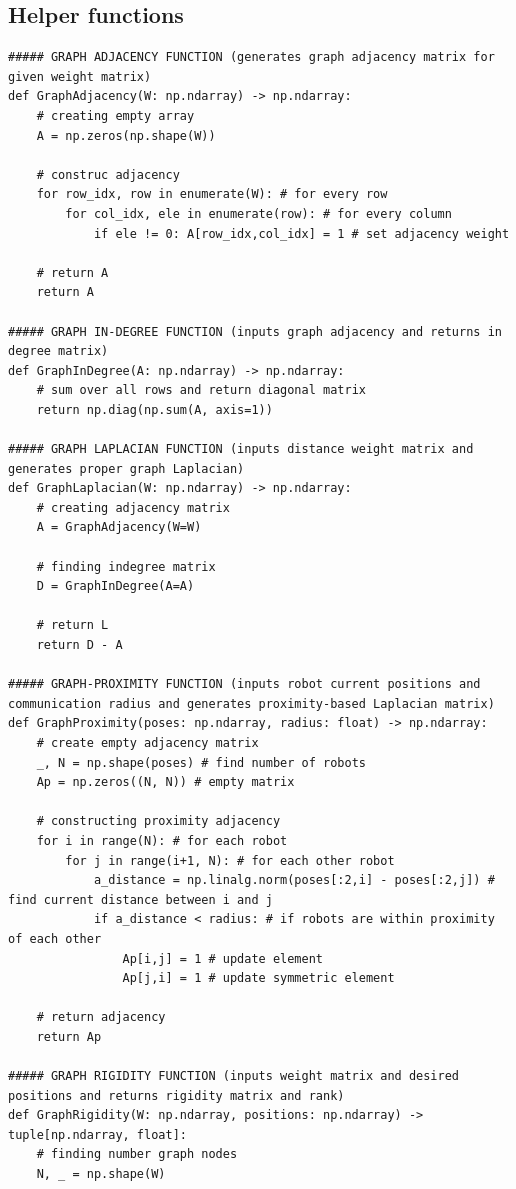 \documentclass[11pt]{article}
\begin{document}
\subsection{Helper functions}
\begin{verbatim}
##### GRAPH ADJACENCY FUNCTION (generates graph adjacency matrix for given weight matrix)
def GraphAdjacency(W: np.ndarray) -> np.ndarray:
    # creating empty array
    A = np.zeros(np.shape(W))

    # construc adjacency
    for row_idx, row in enumerate(W): # for every row
        for col_idx, ele in enumerate(row): # for every column
            if ele != 0: A[row_idx,col_idx] = 1 # set adjacency weight

    # return A
    return A

##### GRAPH IN-DEGREE FUNCTION (inputs graph adjacency and returns in degree matrix)
def GraphInDegree(A: np.ndarray) -> np.ndarray:
    # sum over all rows and return diagonal matrix
    return np.diag(np.sum(A, axis=1))

##### GRAPH LAPLACIAN FUNCTION (inputs distance weight matrix and generates proper graph Laplacian)
def GraphLaplacian(W: np.ndarray) -> np.ndarray:
    # creating adjacency matrix
    A = GraphAdjacency(W=W)

    # finding indegree matrix
    D = GraphInDegree(A=A)

    # return L
    return D - A

##### GRAPH-PROXIMITY FUNCTION (inputs robot current positions and communication radius and generates proximity-based Laplacian matrix)
def GraphProximity(poses: np.ndarray, radius: float) -> np.ndarray:
    # create empty adjacency matrix
    _, N = np.shape(poses) # find number of robots
    Ap = np.zeros((N, N)) # empty matrix

    # constructing proximity adjacency
    for i in range(N): # for each robot
        for j in range(i+1, N): # for each other robot
            a_distance = np.linalg.norm(poses[:2,i] - poses[:2,j]) # find current distance between i and j
            if a_distance < radius: # if robots are within proximity of each other
                Ap[i,j] = 1 # update element
                Ap[j,i] = 1 # update symmetric element

    # return adjacency
    return Ap

##### GRAPH RIGIDITY FUNCTION (inputs weight matrix and desired positions and returns rigidity matrix and rank)
def GraphRigidity(W: np.ndarray, positions: np.ndarray) -> tuple[np.ndarray, float]:
    # finding number graph nodes
    N, _ = np.shape(W)


\end{verbatim}
\end{document}
